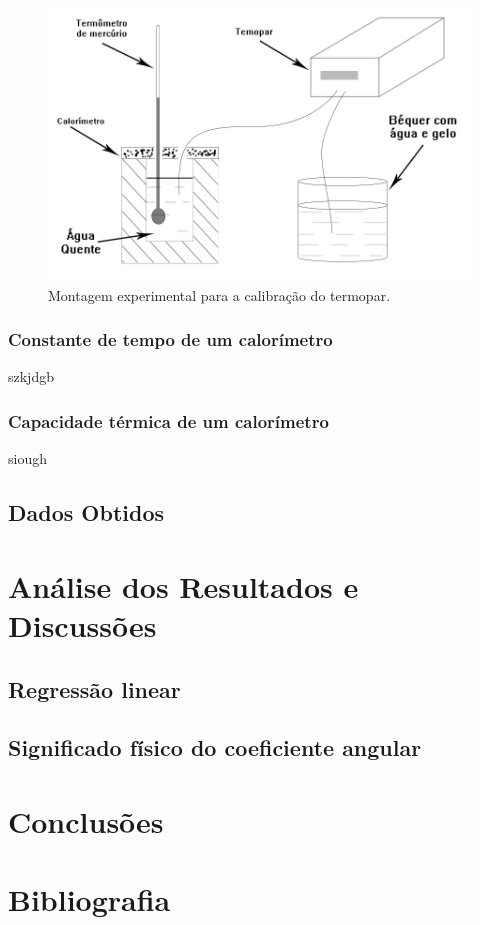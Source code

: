 \documentclass[12pt,a4paper]{article}
\begin{document}
\begin{figure}
\centering
\includegraphics[scale=0.3]{Fig6a2.jpg}
\caption{Montagem experimental para a calibração do termopar.}
\label{exptermopar}
\end{figure}


\subsubsection{Constante de tempo de um calorímetro}
szkjdgb

\subsubsection{Capacidade térmica de um calorímetro}
siough



\subsection{Dados Obtidos}




\section{Análise dos Resultados e Discussões}

\subsection{Regressão linear}

\subsection{Significado físico do coeficiente angular}



\section{Conclusões}


\section{Bibliografia}
\end{document}

